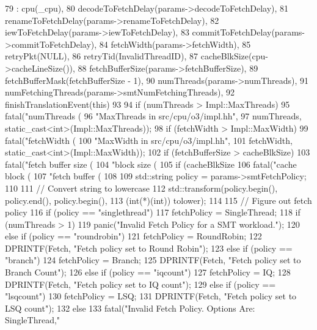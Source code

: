 \begin{DoxyCode}
79     : cpu(_cpu),
80       decodeToFetchDelay(params->decodeToFetchDelay),
81       renameToFetchDelay(params->renameToFetchDelay),
82       iewToFetchDelay(params->iewToFetchDelay),
83       commitToFetchDelay(params->commitToFetchDelay),
84       fetchWidth(params->fetchWidth),
85       retryPkt(NULL),
86       retryTid(InvalidThreadID),
87       cacheBlkSize(cpu->cacheLineSize()),
88       fetchBufferSize(params->fetchBufferSize),
89       fetchBufferMask(fetchBufferSize - 1),
90       numThreads(params->numThreads),
91       numFetchingThreads(params->smtNumFetchingThreads),
92       finishTranslationEvent(this)
93 {
94     if (numThreads > Impl::MaxThreads)
95         fatal("numThreads (%
96               "\tincrease MaxThreads in src/cpu/o3/impl.hh\n",
97               numThreads, static_cast<int>(Impl::MaxThreads));
98     if (fetchWidth > Impl::MaxWidth)
99         fatal("fetchWidth (%
100              "\tincrease MaxWidth in src/cpu/o3/impl.hh\n",
101              fetchWidth, static_cast<int>(Impl::MaxWidth));
102     if (fetchBufferSize > cacheBlkSize)
103         fatal("fetch buffer size (%
104               "block size (%
105     if (cacheBlkSize %
106         fatal("cache block (%
107               "fetch buffer (%
108 
109     std::string policy = params->smtFetchPolicy;
110 
111     // Convert string to lowercase
112     std::transform(policy.begin(), policy.end(), policy.begin(),
113                    (int(*)(int)) tolower);
114 
115     // Figure out fetch policy
116     if (policy == "singlethread") {
117         fetchPolicy = SingleThread;
118         if (numThreads > 1)
119             panic("Invalid Fetch Policy for a SMT workload.");
120     } else if (policy == "roundrobin") {
121         fetchPolicy = RoundRobin;
122         DPRINTF(Fetch, "Fetch policy set to Round Robin\n");
123     } else if (policy == "branch") {
124         fetchPolicy = Branch;
125         DPRINTF(Fetch, "Fetch policy set to Branch Count\n");
126     } else if (policy == "iqcount") {
127         fetchPolicy = IQ;
128         DPRINTF(Fetch, "Fetch policy set to IQ count\n");
129     } else if (policy == "lsqcount") {
130         fetchPolicy = LSQ;
131         DPRINTF(Fetch, "Fetch policy set to LSQ count\n");
132     } else {
133         fatal("Invalid Fetch Policy. Options Are: {SingleThread,"
}}}
\end{DoxyCode}
